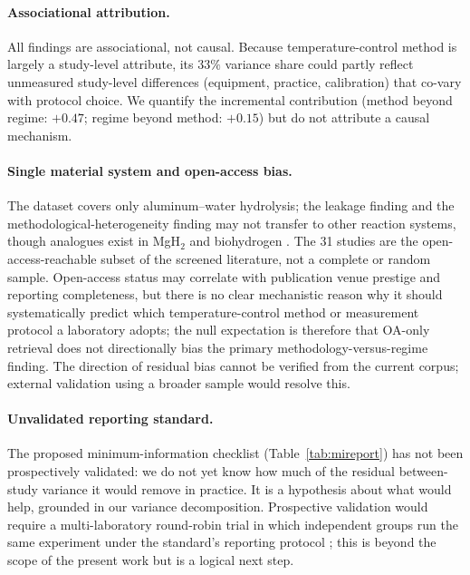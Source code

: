 \paragraph{Associational attribution.}
All findings are associational, not causal. Because temperature-control method is largely a
study-level attribute, its $33\%$ variance share could partly reflect unmeasured
study-level differences (equipment, practice, calibration) that co-vary with protocol
choice. We quantify the incremental contribution (method beyond regime: $+0.47$; regime
beyond method: $+0.15$) but do not attribute a causal mechanism.

\paragraph{Single material system and open-access bias.}
The dataset covers only aluminum--water hydrolysis; the leakage finding and the
methodological-heterogeneity finding may not transfer to other reaction systems, though
analogues exist in MgH$_2$ and biohydrogen \citep{wulf2021,hoque2018}. The 31 studies
are the open-access-reachable subset of the screened literature, not a complete or
random sample. Open-access status may correlate with publication venue prestige and
reporting completeness, but there is no clear mechanistic reason why it should
systematically predict which temperature-control method or measurement protocol a
laboratory adopts; the null expectation is therefore that OA-only retrieval does not
directionally bias the primary methodology-versus-regime finding. The direction of
residual bias cannot be verified from the current corpus; external validation using a
broader sample would resolve this.

\paragraph{Unvalidated reporting standard.}
The proposed minimum-information checklist (Table~\ref{tab:mireport}) has not been
prospectively validated: we do not yet know how much of the residual between-study
variance it would remove in practice. It is a hypothesis about what would help, grounded
in our variance decomposition. Prospective validation would require a multi-laboratory
round-robin trial in which independent groups run the same experiment under the
standard's reporting protocol \citep[analogous to those for MgH$_2$ and
biohydrogen;][]{wulf2021,hoque2018}; this is beyond the scope of the present work
but is a logical next step.

